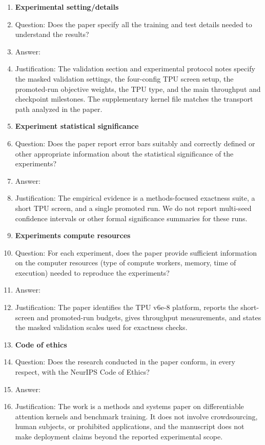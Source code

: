 \begin{enumerate}
\item {\bf Experimental setting/details}
    \item[] Question: Does the paper specify all the training and test details needed to understand the results?
    \item[] Answer: \answerYes{}
    \item[] Justification: The validation section and experimental protocol notes specify the masked validation settings, the four-config TPU screen setup, the promoted-run objective weights, the TPU type, and the main throughput and checkpoint milestones. The supplementary kernel file matches the transport path analyzed in the paper.

\item {\bf Experiment statistical significance}
    \item[] Question: Does the paper report error bars suitably and correctly defined or other appropriate information about the statistical significance of the experiments?
    \item[] Answer: \answerNo{}
    \item[] Justification: The empirical evidence is a methods-focused exactness suite, a short TPU screen, and a single promoted run. We do not report multi-seed confidence intervals or other formal significance summaries for these runs.

\item {\bf Experiments compute resources}
    \item[] Question: For each experiment, does the paper provide sufficient information on the computer resources (type of compute workers, memory, time of execution) needed to reproduce the experiments?
    \item[] Answer: \answerYes{}
    \item[] Justification: The paper identifies the TPU v6e-8 platform, reports the short-screen and promoted-run budgets, gives throughput measurements, and states the masked validation scales used for exactness checks.

\item {\bf Code of ethics}
    \item[] Question: Does the research conducted in the paper conform, in every respect, with the NeurIPS Code of Ethics?
    \item[] Answer: \answerYes{}
    \item[] Justification: The work is a methods and systems paper on differentiable attention kernels and benchmark training. It does not involve crowdsourcing, human subjects, or prohibited applications, and the manuscript does not make deployment claims beyond the reported experimental scope.


\end{enumerate}
